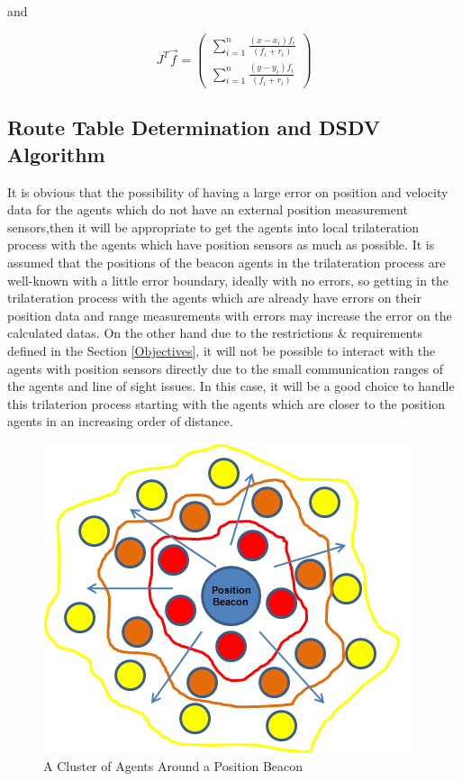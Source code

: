 and 

\begin{equation}
J^T\vec{f} = \left(\begin{matrix}
\sum_{i=1}^{n}\frac{(x-x_i)f_i}{(f_i+r_i)} \\
\sum_{i=1}^{n}\frac{(y-y_i)f_i}{(f_i+r_i)}
\end{matrix}\right)
\end{equation}
	
	
\subsection{ Route Table Determination and  DSDV Algorithm}
It is obvious that the possibility of having a large error on position and velocity data for the agents which do not have an external position measurement sensors,then it will be appropriate to get the agents into local trilateration process with the agents which have position sensors as much as possible. It is assumed that the positions of the beacon agents in the trilateration process are well-known with a little error boundary, ideally with no errors, so getting in the trilateration process with the agents which are already have errors on their position data and range measurements with errors may increase the error on the calculated datas. On the other hand due to the restrictions $\&$ requirements defined in the Section \ref{Objectives}, it will not be possible to interact with the agents with position sensors directly due to the small communication ranges of the agents and line of sight issues. In this case, it will be a good choice to handle this trilaterion process starting with the agents which are closer to the position agents in an increasing order of distance.
\begin{figure}[H] \label{position_beacon}
\caption{A Cluster of Agents Around a Position Beacon}
\centering
\includegraphics[scale = 0.65]{position_beacon}
\end{figure}

